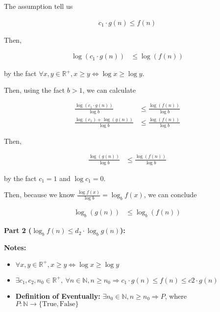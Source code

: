 \documentclass[12pt]{article}
\begin{document}
\begin{enumerate}[a.]
    \bigskip

    The assumption tell us

    \begin{align}
        c_1 \cdot g(n) \leq f(n)
    \end{align}

    \bigskip

    Then,

    \begin{align}
        \log (c_1 \cdot g(n)) &\leq \log (f(n))
    \end{align}

    by the fact $\forall x,y \in \mathbb{R}^{+}, x \geq y \Leftrightarrow \log x \geq \log y$.

    \bigskip

    Then, using the fact $b > 1$, we can calculate

    \begin{align}
        \frac{\log (c_1 \cdot g(n))}{\log b} &\leq \frac{\log (f(n))}{\log b}\\
        \frac{\log (c_1) + \log (g(n))}{\log b} &\leq \frac{\log (f(n))}{\log b}
    \end{align}

    \bigskip

    Then,

    \begin{align}
        \frac{\log (g(n))}{\log b} &\leq \frac{\log (f(n))}{\log b}
    \end{align}

    by the fact $c_1 = 1$ and $\log c_1 = 0$.

    \bigskip

    Then, because we know $\frac{\log f(x)}{\log b} = \log_b f(x)$, we can conclude

    \begin{align}
        \log_b (g(n)) &\leq \log_b (f(n))
    \end{align}


    \bigskip

    \textbf{Part 2 ($\log_b f(n) \leq d_2 \cdot \log_b g(n)$):}

    \bigskip

    \textbf{Notes:}

    \begin{itemize}
        \item $\forall x,y \in \mathbb{R}^{+}, x \geq y \Leftrightarrow \log x \geq \log y$


        \item $\exists c_1,c_2,n_0 \in \mathbb{R}^{+},\:\forall n \in \mathbb{N},
        n \geq n_0 \Rightarrow c_1 \cdot g(n) \leq f(n) \leq c2 \cdot g(n)$

        \item \textbf{Definition of Eventually:} $\exists n_0 \in \mathbb{N},
        n \geq n_0 \Rightarrow P$, where $P:\mathbb{N} \to \{\text{True},\text{False}\}$
    \end{itemize}
\end{enumerate}
\end{document}
